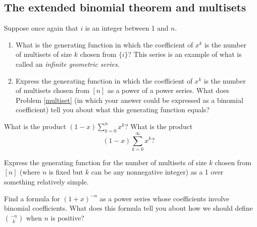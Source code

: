 \ep


\subsection{The extended binomial theorem and multisets}
\bp \iteme Suppose once again that $i$ is an integer between 1 and $n$.
\begin{enumerate}
\item What is the generating function in which the coefficient
of
$x^k$ is the number of multisets of size $k$ chosen from $\{i\}$?  This
series is an example of what is called an {\em infinite geometric
series}.
\item Express the generating function in which the coefficient of $x^k$
is the number of multisets chosen from $[n]$ as a power of a power
series.  What does Problem \ref{multiset} (in which your answer could
be expressed as a binomial coefficient) tell you about what this
generating function equals?  
\end{enumerate}

 \itemm  What is the product $(1-x)\sum_{k=0}^n x^k$?  What is 
the product $$(1-x)\sum_{k=0}^\infty x^k?$$

\itemei Express the generating function for the number of multisets of
size
$k$ chosen from $[n]$ (where $n$ is fixed but $k$ can be any nonnegative
integer) as a 1 over something relatively simple.

\iteme Find a formula for $(1+x)^{-n}$ as a power series whose coefficients
involve binomial coefficients.   What does this formula tell you about
how we should define
$-n\choose k$ when $n$ is positive? \label{negnchoosek} 

